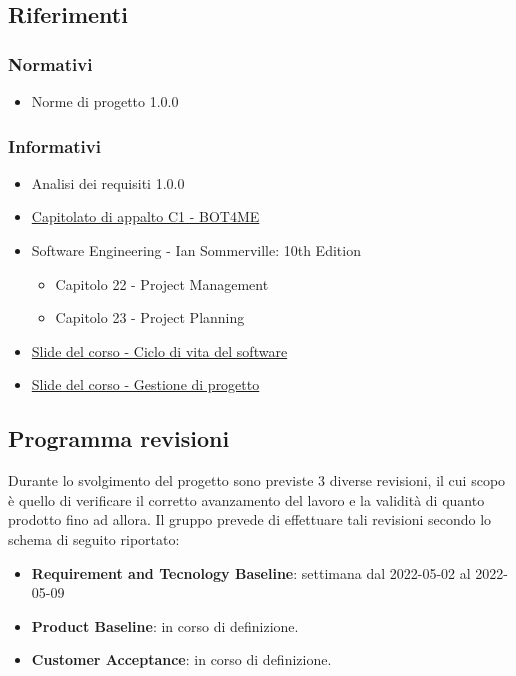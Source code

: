 \subsection{Riferimenti}

\subsubsection{Normativi}
\begin{itemize}
    \item Norme di progetto 1.0.0
\end{itemize}

\subsubsection{Informativi}
\begin{itemize}
    \item Analisi dei requisiti 1.0.0
    \item  \href{https://www.math.unipd.it/~tullio/IS-1/2021/Progetto/C1.pdf}{\color{blue} Capitolato di appalto C1 - BOT4ME}
    \item Software Engineering - Ian Sommerville: 10th Edition
    \begin{itemize}
        \item Capitolo 22 - Project Management
        \item Capitolo 23 - Project Planning
    \end{itemize}
    \item \href{https://www.math.unipd.it/~tullio/IS-1/2021/Dispense/T05.pdf}{\color{blue} Slide del corso - Ciclo di vita del software}
    \item \href{https://www.math.unipd.it/~tullio/IS-1/2021/Dispense/T06.pdf}{\color{blue} Slide del corso - Gestione di progetto}
\end{itemize}

\subsection{Programma revisioni}
Durante lo svolgimento del progetto sono previste 3 diverse revisioni, il cui scopo è quello di verificare il corretto avanzamento del lavoro e la validità di quanto prodotto fino ad allora. Il gruppo prevede di effettuare tali revisioni secondo lo schema di seguito riportato: 
\begin{itemize}
    \item \textbf{Requirement and Tecnology Baseline}: settimana dal    2022-05-02 al 2022-05-09
    \item \textbf{Product Baseline}: in corso di definizione.
    \item \textbf{Customer Acceptance}: in corso di definizione.
\end{itemize}